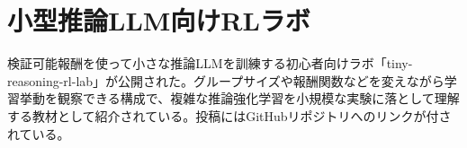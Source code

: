 \section{小型推論LLM向けRLラボ}
検証可能報酬を使って小さな推論LLMを訓練する初心者向けラボ「tiny-reasoning-rl-lab」が公開された。グループサイズや報酬関数などを変えながら学習挙動を観察できる構成で、複雑な推論強化学習を小規模な実験に落として理解する教材として紹介されている。投稿にはGitHubリポジトリへのリンクが付されている。
